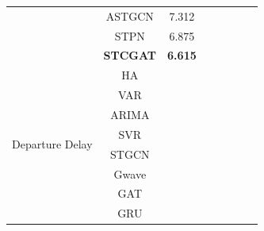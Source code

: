\documentclass[12pt,a4paper]{report}
\begin{document}
\begin{table}[h!]
{\begin{tabular}{cccccccc}
                                              & ASTGCN          & 7.312                        &                            &                            &               &              &               \\
                                              & STPN            & 6.875                        &                            &                            &               &              &               \\
                                              & \textbf{STCGAT} & \textbf{6.615}               &                            &                            &               &              &               \\ \midrule
            \multirow{11}{*}{Departure Delay} & HA              &                              &                            &                            &               &              &               \\
                                              & VAR             &                              &                            &                            &               &              &               \\
                                              & ARIMA           &                              &                            &                            &               &              &               \\
                                              & SVR             &                              &                            &                            &               &              &               \\
                                              & STGCN           &                              &                            &                            &               &              &               \\
                                              & Gwave           &                              &                            &                            &               &              &               \\
                                              & GAT             &                              &                            &                            &               &              &               \\
                                              & GRU             &                              &                            &                            &               &              &               \\

\end{tabular}}
\end{table}
\end{document}
